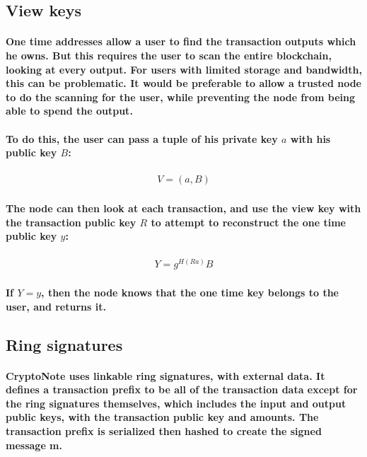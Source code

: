 \documentclass{article}
\begin{document}
\subsection{View keys}

\paragraph{One time addresses allow a user to find the transaction outputs which he owns.  But this requires the user to scan the entire blockchain, looking at every output.  For users with limited storage and bandwidth, this can be problematic.  It would be preferable to allow a trusted node to do the scanning for the user, while preventing the node from being able to spend the output.}

\paragraph{To do this, the user can pass a tuple of his private key $a$ with his public key $B$:}

\begin{eqnarray}
  V = (a, B)
\end{eqnarray}

\paragraph{The node can then look at each transaction, and use the view key with the transaction public key $R$ to attempt to reconstruct the one time public key $y$:}

\begin{eqnarray}
  Y = g^{H(Ra)} B
\end{eqnarray}

\paragraph{If $Y = y$, then the node knows that the one time key belongs to the user, and returns it.}


\subsection{Ring signatures}

\paragraph{CryptoNote uses linkable ring signatures, with external data.  It defines a transaction prefix to be all of the transaction data except for the ring signatures themselves, which includes the input and output public keys, with the transaction public key and amounts.  The transaction prefix is serialized then hashed to create the signed message m.}
\end{document}
